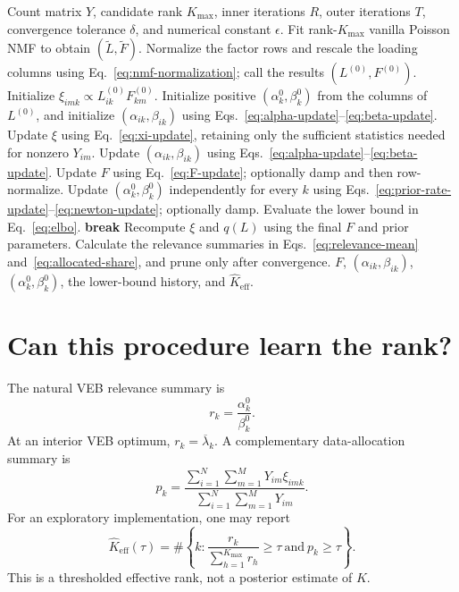 \documentclass[11pt]{article}
\begin{document}
\begin{algorithm}[H]
\caption{VEB Poisson NMF initialized by vanilla NMF}
\label{alg:veb-nmf}
\small
\begin{algorithmic}[1]
\Require Count matrix $Y$, candidate rank $K_{\max}$, inner iterations $R$,
outer iterations $T$, convergence tolerance $\delta$, and numerical constant
$\epsilon$.
\State Fit rank-$K_{\max}$ vanilla Poisson NMF to obtain
$(\widetilde L,\widetilde F)$.
\State Normalize the factor rows and rescale the loading columns using
Eq.~\eqref{eq:nmf-normalization}; call the results $(L^{(0)},F^{(0)})$.
\State Initialize $\xi_{imk}\propto L_{ik}^{(0)}F_{km}^{(0)}$.
\State Initialize positive $(\alpha_k^0,\beta_k^0)$ from the columns of
$L^{(0)}$, and initialize $(\alpha_{ik},\beta_{ik})$ using
Eqs.~\eqref{eq:alpha-update}--\eqref{eq:beta-update}.
    \State Update $\xi$ using Eq.~\eqref{eq:xi-update}, retaining only the
    sufficient statistics needed for nonzero $Y_{im}$.
    \State Update $(\alpha_{ik},\beta_{ik})$ using
    Eqs.~\eqref{eq:alpha-update}--\eqref{eq:beta-update}.
  \EndFor
  \State Update $F$ using Eq.~\eqref{eq:F-update}; optionally damp and then
  row-normalize.
  \State Update $(\alpha_k^0,\beta_k^0)$ independently for every $k$ using
  Eqs.~\eqref{eq:prior-rate-update}--\eqref{eq:newton-update}; optionally damp.
  \State Evaluate the lower bound in Eq.~\eqref{eq:elbo}.
    \State \textbf{break}
  \EndIf
\EndFor
\State Recompute $\xi$ and $q(L)$ using the final $F$ and prior parameters.
\State Calculate the relevance summaries in Eqs.~\eqref{eq:relevance-mean}
and~\eqref{eq:allocated-share}, and prune only after convergence.
\State \Return $F$, $(\alpha_{ik},\beta_{ik})$,
$(\alpha_k^0,\beta_k^0)$, the lower-bound history, and
$\widehat K_{\mathrm{eff}}$.
\end{algorithmic}
\end{algorithm}


\section{Can this procedure learn the rank?}
\label{sec:rank}

The natural VEB relevance summary is
\begin{equation}
  r_k
  =
  \frac{\alpha_k^0}{\beta_k^0}.
  \label{eq:relevance-mean}
\end{equation}
At an interior VEB optimum, $r_k=\overline\lambda_k$.  A complementary
data-allocation summary is
\begin{equation}
  p_k
  =
  \frac{
    \sum_{i=1}^N\sum_{m=1}^M Y_{im}\xi_{imk}
  }{
    \sum_{i=1}^N\sum_{m=1}^M Y_{im}
  }.
  \label{eq:allocated-share}
\end{equation}
For an exploratory implementation, one may report
\begin{equation}
  \widehat K_{\mathrm{eff}}(\tau)
  =
  \#\left\{
    k:
    \frac{r_k}{\sum_{h=1}^{K_{\max}}r_h}\geq\tau
    \ \text{and}\ 
    p_k\geq\tau
  \right\}.
  \label{eq:effective-rank}
\end{equation}
This is a thresholded effective rank, not a posterior estimate of $K$.
\end{document}
